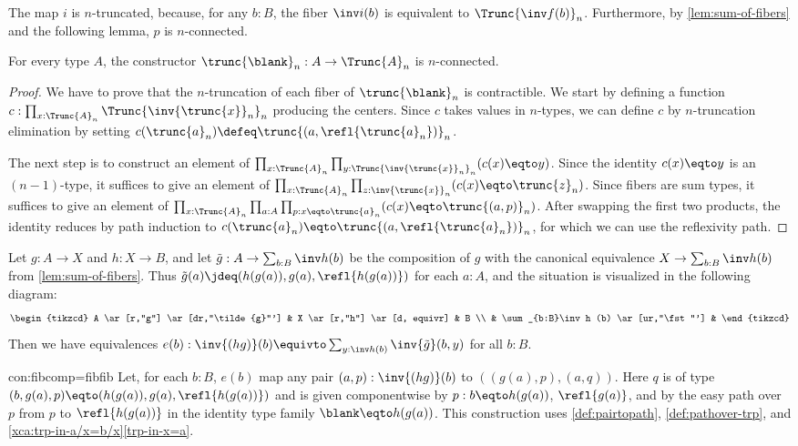 The map $i$ is $n$-truncated, because, for any $b:B$,
the fiber $\inv i (b)$ is equivalent to $\Trunc{\inv f (b)}_n$.
Furthermore, by \cref{lem:sum-of-fibers} and the following lemma,
$p$ is $n$-connected.

\begin{lemma}\label{lem:trunc-n-connected}
For every type $A$, the constructor $\trunc{\blank}_n : A\to \Trunc{A}_n$
is $n$-connected.
\end{lemma}
\begin{proof}
We have to prove that the $n$-truncation of each fiber of $\trunc{\blank}_n$
is contractible. We start by defining a function
$c:\prod_{x:\Trunc{A}_n} \Trunc{\inv{\trunc{x}}_n}_n$ producing the centers.
Since $c$ takes values in $n$-types, we can define $c$ by
$n$-truncation elimination by setting
$c(\trunc{a}_n) \defeq \trunc{(a,\refl{\trunc{a}_n})}_n$.

The next step is to construct an element of
$\prod_{x:\Trunc{A}_n} \prod_{y:\Trunc{\inv{\trunc{x}}_n}_n} (c(x)\eqto y)$.
Since the identity $c(x)\eqto y$ is an $(n-1)$-type, it suffices to give an element of
$\prod_{x:\Trunc{A}_n} \prod_{z:\inv{\trunc{x}}_n} (c(x)\eqto \trunc{z}_n)$.
Since fibers are sum types,  it suffices to give an element of
$\prod_{x:\Trunc{A}_n} \prod_{a:A} \prod_{p: x\eqto \trunc{a}_n} (c(x)\eqto \trunc{(a,p)}_n)$.
After swapping the first two products, the identity reduces by path induction
to $c(\trunc{a}_n)\eqto \trunc{(a,\refl{\trunc{a}_n})}_n$, for which we can use
the reflexivity path.
\end{proof}

\begin{construction}\label{con:fibcomp=fibfib}
Let $g:A\to X$ and $h: X\to B$, and let $\tilde{g}:A\to \sum_{b:B}\inv h (b)$
be the composition of $g$ with the canonical equivalence
$X\to \sum_{b:B}\inv h (b)$ from \cref{lem:sum-of-fibers}.
Thus $\tilde{g}(a)\jdeq (h(g(a)),g(a),\refl{h(g(a))})$ for each $a:A$,
and the situation is visualized in the following diagram:
  \[
    \begin{tikzcd}
      A \ar[r,"g"] \ar[dr,"\tilde{g}"'] & X \ar[r,"h"] \ar[d, equivr] & B \\
      & \sum_{b:B}\inv h (b) \ar[ur,"\fst"'] &
    \end{tikzcd}
  \]
Then we have equivalences $e(b) : \inv {(hg)} (b) \equivto \sum_{y:\inv h (b)} \inv {\tilde{g}}(b,y)$
for all $b:B$.
\end{construction}
\begin{implementation}{con:fibcomp=fibfib}
Let, for each $b:B$, $e(b)$ map any pair $(a,p):\inv {(hg)} (b)$ to
$((g(a),p),(a,q))$. Here $q$ is of type $(b,g(a),p) \eqto  (h(g(a)),g(a),\refl{h(g(a))})$
and is given componentwise by $p: b\eqto h(g(a))$, $\refl{g(a)}$, and by the
easy path over $p$ from $p$ to $\refl{h(g(a))}$ in the identity type family $\blank\eqto h(g(a))$.
This construction uses \cref{def:pairtopath}, \cref{def:pathover-trp},
and \cref{xca:trp-in-a/x=b/x}\ref{trp-in-x=a}.
\end{implementation}

